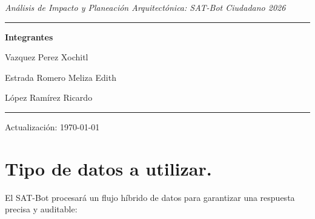 \documentclass[10pt,a4paper]{article}
\begin{document}
\begin{titlepage}
    \vspace{0.3cm}
    {\large\textit{Análisis de Impacto y Planeación Arquitectónica: SAT-Bot Ciudadano 2026}}

    \vspace{6cm}

    \rule{\linewidth}{0.5mm}

    \vspace{0.3cm}
    {\large\textbf{Integrantes}}

    \vspace{0.3cm}
    {\large Vazquez Perez Xochitl}

    \vspace{0.15cm}
    {\large Estrada Romero Meliza Edith}

    \vspace{0.15cm}
    {\large López Ramírez Ricardo}


    \vspace{0.5cm}
    \rule{\linewidth}{0.5mm}

    \vspace{0.5cm}

    {\small Actualización: \today}

\end{titlepage}



\tableofcontents

\clearpage

\setcounter{page}{1}

\section{Tipo de datos  a utilizar.}

El SAT-Bot procesará un flujo híbrido de datos para garantizar una respuesta
precisa y auditable:
\end{document}
